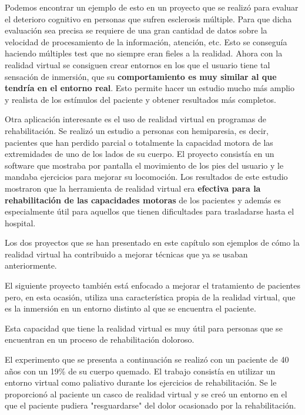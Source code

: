 \documentclass[twoside, 11pt]{epstfg}
\begin{document}
Podemos encontrar un ejemplo de esto en un proyecto que se realizó para evaluar el deterioro cognitivo en personas que sufren esclerosis múltiple. Para que dicha evaluación sea precisa se requiere de una gran cantidad de datos sobre la velocidad de procesamiento de la información, atención, etc. Esto se conseguía haciendo múltiples test que no siempre eran fieles a la realidad.
Ahora con la realidad virtual se consiguen crear entornos en los que el usuario tiene tal sensación de inmersión, que su \textbf{comportamiento es muy similar al que tendría en el entorno real}. Esto permite hacer un estudio mucho más amplio y realista de los estímulos del paciente y obtener resultados más completos.\cite{LamargueHamel201594}


Otra aplicación interesante es el uso de realidad virtual en programas de rehabilitación.
Se realizó un estudio a personas con hemiparesia, es decir, pacientes que han perdido parcial o totalmente la capacidad motora de las extremidades de uno de los lados de su cuerpo. El proyecto consistía en un software que mostraba por pantalla el movimiento de los pies  del usuario y le mandaba ejercicios para mejorar su locomoción. 
Los resultados de este estudio mostraron que la herramienta de realidad virtual era \textbf{efectiva para la rehabilitación de las capacidades motoras} de los pacientes y además es especialmente útil para aquellos que tienen dificultades para trasladarse hasta el hospital.\cite{Llorens2015418}

Los dos proyectos que se han presentado en este capítulo son ejemplos de cómo la realidad virtual ha contribuido a mejorar técnicas que ya se usaban anteriormente.

El siguiente proyecto también está enfocado a mejorar el tratamiento de pacientes pero, en esta ocasión, utiliza una característica propia de la realidad virtual, que es la inmersión en un entorno distinto al que se encuentra el paciente.

Esta capacidad que tiene la realidad virtual es muy útil para personas que se encuentran en un proceso de rehabilitación doloroso.

El experimento que se presenta a continuación se realizó con un paciente de 40 años con un 19\% de su cuerpo quemado. El trabajo consistía en utilizar un entorno virtual como paliativo durante los ejercicios de rehabilitación.
Se le proporcionó al paciente un casco de realidad virtual y se creó un entorno en el que el paciente pudiera "resguardarse" del dolor ocasionado por la rehabilitación.
\end{document}
